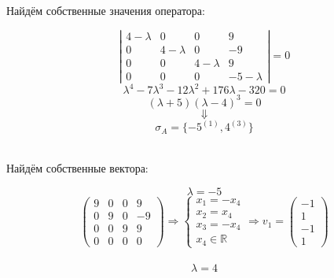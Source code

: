 \documentclass{article}
\begin{document}
\begin{center}
Найдём собственные значения оператора:
\end{center}
$$\left|\begin{matrix}
4-\lambda & 0 & 0 & 9 \\
0 & 4-\lambda & 0 & -9 \\
0 & 0 & 4-\lambda & 9 \\
0 & 0 & 0 & -5-\lambda
\end{matrix}\right| = 0$$
$$\lambda^4-7\lambda^3-12\lambda^2+176\lambda-320 = 0$$
$$(\lambda+5)(\lambda-4)^3=0$$
$$\Downarrow$$
$$\sigma_A = \{-5^{(1)},4^{(3)}\}$$ \\
\begin{center}
Найдём собственные вектора:
\end{center}
$$\lambda = -5$$
$$\begin{pmatrix}
9 & 0 & 0 & 9 \\
0 & 9 & 0 & -9 \\
0 & 0 & 9 & 9 \\
0 & 0 & 0 & 0
\end{pmatrix} \Rightarrow \begin{cases}
x_1 = -x_4 \\
x_2 = x_4\\
x_3 = -x_4 \\
x_4 \in \mathbb{R}
\end{cases} \Rightarrow v_1 = \begin{pmatrix}
-1 \\ 1 \\ -1 \\ 1
\end{pmatrix}$$\\
$$\lambda = 4$$
\end{document}
